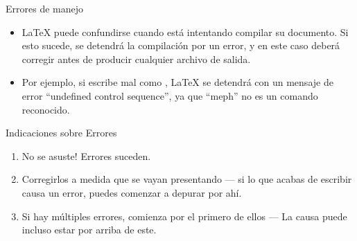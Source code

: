 \documentclass{beamer}
\begin{document}
\begin{frame}[fragile]{Errores de manejo}
  \begin{itemize}
  \item \LaTeX{} puede confundirse cuando está intentando compilar su
    documento. Si esto sucede, se detendrá la compilación por un
    error, y en este caso deberá corregir antes de producir cualquier
    archivo de salida. 
  \item Por ejemplo, si escribe mal  como ,
    \LaTeX{} se detendrá con un mensaje de error ``undefined control
    sequence'', ya que ``meph'' no es un comando reconocido.
  \end{itemize}
  \begin{block}{Indicaciones sobre Errores}
    \begin{enumerate}
    \item No se asuste! Errores suceden.
    \item Corregirlos a medida que se vayan presentando --- si lo que
      acabas de escribir causa un error, puedes comenzar a depurar por ahí.
    \item Si hay múltiples errores, comienza por el primero de ellos
      --- La causa puede incluso estar por arriba de este.
    \end{enumerate}
  \end{block}
\end{frame}

\end{document}
